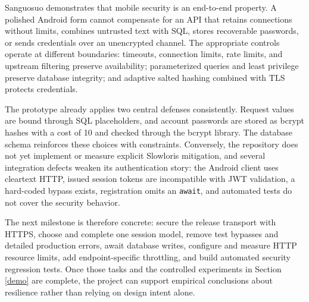 Sanguosuo demonstrates that mobile security is an end-to-end property. A polished Android form cannot compensate for an API that retains connections without limits, combines untrusted text with SQL, stores recoverable passwords, or sends credentials over an unencrypted channel. The appropriate controls operate at different boundaries: timeouts, connection limits, rate limits, and upstream filtering preserve availability; parameterized queries and least privilege preserve database integrity; and adaptive salted hashing combined with TLS protects credentials.

The prototype already applies two central defenses consistently. Request values are bound through SQL placeholders, and account passwords are stored as bcrypt hashes with a cost of 10 and checked through the bcrypt library. The database schema reinforces these choices with constraints. Conversely, the repository does not yet implement or measure explicit Slowloris mitigation, and several integration defects weaken its authentication story: the Android client uses cleartext HTTP, issued session tokens are incompatible with JWT validation, a hard-coded bypass exists, registration omits an \verb|await|, and automated tests do not cover the security behavior.

The next milestone is therefore concrete: secure the release transport with HTTPS, choose and complete one session model, remove test bypasses and detailed production errors, await database writes, configure and measure HTTP resource limits, add endpoint-specific throttling, and build automated security regression tests. Once those tasks and the controlled experiments in Section \ref{demo} are complete, the project can support empirical conclusions about resilience rather than relying on design intent alone.
